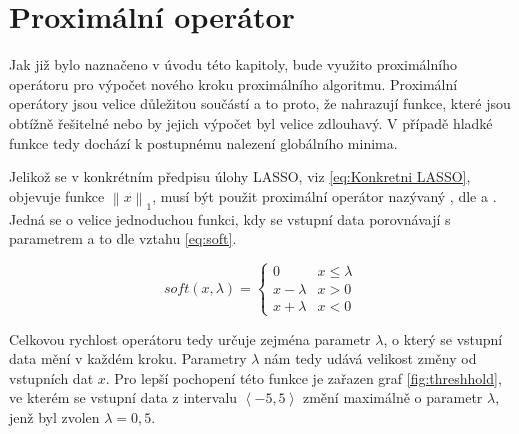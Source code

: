 \documentclass[FM,BP]{tulthesis}
\newcounter{Vzorce}
\begin{document}
\section{Proximální operátor}
\label{subch:proxOpt}
Jak již bylo naznačeno v úvodu této kapitoly, bude využito proximálního operátoru pro výpočet nového kroku proximálního algoritmu. Proximální operátory jsou velice důležitou součástí a to proto, že nahrazují funkce, které jsou obtížně řešitelné nebo by jejich výpočet byl velice zdlouhavý. V případě hladké funkce tedy dochází k postupnému nalezení globálního minima. 

Jelikož se v konkrétním předpisu úlohy LASSO, viz \ref{eq:Konkretni LASSO}, objevuje funkce $\left\| x\right\| _1$, musí být použit proximální operátor nazývaný , dle \cite{proxAlg1} a \cite{proxAlg2}. Jedná se o velice jednoduchou funkci, kdy se vstupní data porovnávají s parametrem a to dle vztahu \ref{eq:soft}. 

\begin{equation} \label{eq:soft} \tag{Vzorec \theVzorce}
soft(x, \lambda) = \begin{cases}
0  & x \leq \lambda\\
x - \lambda & x > 0\\
x + \lambda & x < 0
\end{cases}
\end{equation}
 
 Celkovou rychlost operátoru tedy určuje zejména parametr $\lambda$, o který se vstupní data mění v každém kroku. Parametry $\lambda$ nám tedy udává velikost změny od vstupních dat $x$. Pro lepší pochopení této funkce je zařazen graf \ref{fig:threshhold}, ve kterém se vstupní data z intervalu $\left\langle -5, 5\right\rangle $ změní maximálně o parametr $\lambda$, jenž byl zvolen $\lambda = 0,5$.
 
\end{document}
